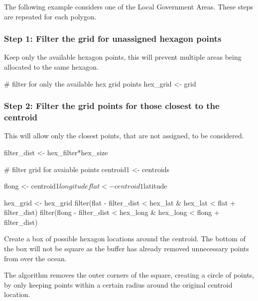 The following example considers one of the Local Government Areas. These
steps are repeated for each polygon.

\hypertarget{step-1-filter-the-grid-for-unassigned-hexagon-points}{%
\subsubsection{Step 1: Filter the grid for unassigned hexagon
points}\label{step-1-filter-the-grid-for-unassigned-hexagon-points}}

Keep only the available hexagon points, this will prevent multiple areas
being allocated to the same hexagon.

\begin{Schunk}
\begin{Sinput}
# filter for only the available hex grid points
hex_grid <- grid %
\end{Sinput}
\end{Schunk}

\hypertarget{step-2-filter-the-grid-points-for-those-closest-to-the-centroid}{%
\subsubsection{Step 2: Filter the grid points for those closest to the
centroid}\label{step-2-filter-the-grid-points-for-those-closest-to-the-centroid}}

This will allow only the closest points, that are not assigned, to be
considered.

\begin{Schunk}
\begin{Sinput}
filter_dist <- hex_filter*hex_size

# filter grid for avaiable points
centroid1 <- centroids %

flong <- centroid1$longitude
flat <- centroid1$latitude

hex_grid <- hex_grid %
        filter(flat - filter_dist < hex_lat & hex_lat < flat + filter_dist) %
        filter(flong - filter_dist < hex_long & hex_long < flong + filter_dist)
\end{Sinput}
\end{Schunk}

Create a box of possible hexagon locations around the centroid. The
bottom of the box will not be square as the buffer has already removed
unnecessary points from over the ocean.

The algorithm removes the outer corners of the square, creating a circle
of points, by only keeping points within a certain radius around the
original centroid location.

